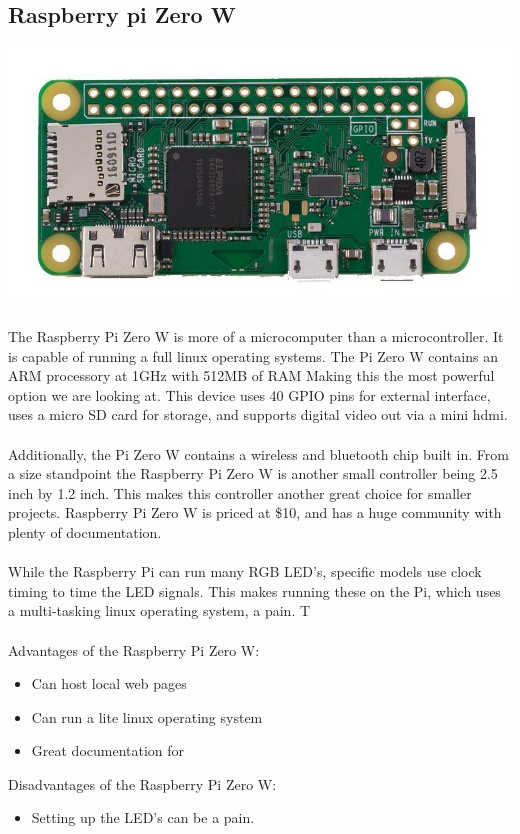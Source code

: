 \documentclass[onecolumn, draftclsnofoot,10pt, compsoc]{IEEEtran}
\begin{document}
		\subsection{Raspberry pi Zero W}
		\includegraphics[scale=0.2]{pi.jpg}
		\\\\
		The Raspberry Pi Zero W is more of a microcomputer than a microcontroller.
		It is capable of running a full linux operating systems. The Pi Zero W
		contains an ARM processory at 1GHz with 512MB of RAM Making this the most
		powerful option we are looking at. This device uses 40 GPIO pins for
		external interface, uses a micro SD card for storage, and supports digital
		video out via a mini hdmi\cite[Pg 2]{pizero}.
		\\\\
		Additionally, the Pi Zero W contains a wireless and bluetooth chip built in.
		From a size standpoint the Raspberry Pi Zero W is another small controller
		being 2.5 inch by 1.2 inch. This makes this controller another great choice
		for smaller projects. Raspberry Pi Zero W is priced at \$10, and has a huge
		community with plenty of documentation.
		\\\\
		While the Raspberry Pi can run many RGB LED's, specific models use clock
		timing to time the LED signals. This makes running these on the Pi, which
		uses a multi-tasking linux operating system, a pain. T
		\\\\
		Advantages of the Raspberry Pi Zero W:
		\begin{itemize}
			\item Can host local web pages
			\item Can run a lite linux operating system
			\item Great documentation for
		\end{itemize}
		Disadvantages of the Raspberry Pi Zero W:
		\begin{itemize}
			\item Setting up the LED's can be a pain.
		\end{itemize}
\end{document}
